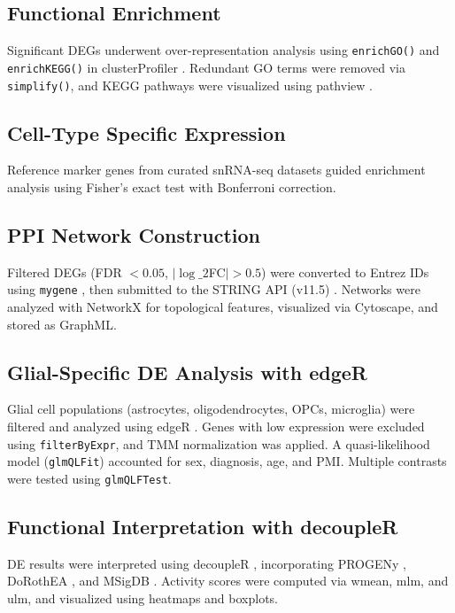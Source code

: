 \documentclass[10pt,letterpaper]{article}
\begin{document}
\subsection*{Functional Enrichment}
Significant DEGs underwent over-representation analysis using \texttt{enrichGO()} and \texttt{enrichKEGG()} in clusterProfiler \cite{Wu2021clusterProfiler}. Redundant GO terms were removed via \texttt{simplify()}, and KEGG pathways were visualized using pathview \cite{Luo2013pathview}.

\subsection*{Cell-Type Specific Expression}
Reference marker genes from curated snRNA-seq datasets guided enrichment analysis using Fisher's exact test with Bonferroni correction.

\subsection*{PPI Network Construction}
Filtered DEGs (FDR $< 0.05$, $|\log\_2$FC$| > 0.5$) were converted to Entrez IDs using \texttt{mygene} \cite{Wu2013mygene}, then submitted to the STRING API (v11.5) \cite{Szklarczyk2019STRING}. Networks were analyzed with NetworkX \cite{Hagberg2008networkx} for topological features, visualized via Cytoscape, and stored as GraphML.

\subsection*{Glial-Specific DE Analysis with edgeR}
Glial cell populations (astrocytes, oligodendrocytes, OPCs, microglia) were filtered and analyzed using edgeR \cite{Robinson2010edgeR}. Genes with low expression were excluded using \texttt{filterByExpr}, and TMM normalization was applied. A quasi-likelihood model (\texttt{glmQLFit}) accounted for sex, diagnosis, age, and PMI. Multiple contrasts were tested using \texttt{glmQLFTest}.

\subsection*{Functional Interpretation with decoupleR}
DE results were interpreted using decoupleR \cite{badia2022decoupler}, incorporating PROGENy \cite{schubert2018perturbation}, DoRothEA \cite{garciaalonso2019benchmark}, and MSigDB \cite{liberzon2015molecular, liberzon2011molecular}. Activity scores were computed via wmean, mlm, and ulm, and visualized using heatmaps and boxplots.
\end{document}
